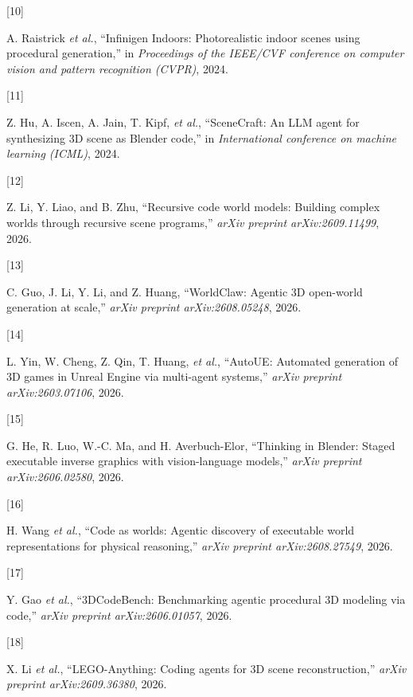 \documentclass[
  11pt,
]{article}
\newlength{\cslhangindent}
\newlength{\csllabelwidth}
\newenvironment{CSLReferences}[2] %
 {\begin{list}{}{%
  \setlength{\itemindent}{0pt}
  \setlength{\leftmargin}{0pt}
  \setlength{\parsep}{0pt}
  \ifodd #1
   \setlength{\leftmargin}{\cslhangindent}
   \setlength{\itemindent}{-1\cslhangindent}
  \fi
  \setlength{\itemsep}{#2\baselineskip}}}
 {\end{list}}
\newcommand{\CSLLeftMargin}[1]{\parbox[t]{\csllabelwidth}{\strut#1\strut}}
\newcommand{\CSLRightInline}[1]{\parbox[t]{\linewidth - \csllabelwidth}{\strut#1\strut}}
\begin{document}
\begin{CSLReferences}{0}{0}
\CSLLeftMargin{{[}10{]} }%
\CSLRightInline{A. Raistrick \emph{et al.}, {``{Infinigen Indoors}:
Photorealistic indoor scenes using procedural generation,''} in
\emph{Proceedings of the IEEE/CVF conference on computer vision and
pattern recognition (CVPR)}, 2024.}

\CSLLeftMargin{{[}11{]} }%
\CSLRightInline{{Z. Hu, A. Iscen, A. Jain, T. Kipf, \emph{et al.}},
{``{SceneCraft}: An {LLM} agent for synthesizing {3D} scene as {Blender}
code,''} in \emph{International conference on machine learning (ICML)},
2024.}

\CSLLeftMargin{{[}12{]} }%
\CSLRightInline{Z. Li, Y. Liao, and B. Zhu, {``Recursive code world
models: Building complex worlds through recursive scene programs,''}
\emph{arXiv preprint arXiv:2609.11499}, 2026.}

\CSLLeftMargin{{[}13{]} }%
\CSLRightInline{C. Guo, J. Li, Y. Li, and Z. Huang, {``{WorldClaw}:
Agentic {3D} open-world generation at scale,''} \emph{arXiv preprint
arXiv:2608.05248}, 2026.}

\CSLLeftMargin{{[}14{]} }%
\CSLRightInline{{L. Yin, W. Cheng, Z. Qin, T. Huang, \emph{et al.}},
{``{AutoUE}: Automated generation of {3D} games in {Unreal Engine} via
multi-agent systems,''} \emph{arXiv preprint arXiv:2603.07106}, 2026.}

\CSLLeftMargin{{[}15{]} }%
\CSLRightInline{G. He, R. Luo, W.-C. Ma, and H. Averbuch-Elor,
{``Thinking in {Blender}: Staged executable inverse graphics with
vision-language models,''} \emph{arXiv preprint arXiv:2606.02580},
2026.}

\CSLLeftMargin{{[}16{]} }%
\CSLRightInline{H. Wang \emph{et al.}, {``Code as worlds: Agentic
discovery of executable world representations for physical reasoning,''}
\emph{arXiv preprint arXiv:2608.27549}, 2026.}

\CSLLeftMargin{{[}17{]} }%
\CSLRightInline{Y. Gao \emph{et al.}, {``{3DCodeBench}: Benchmarking
agentic procedural {3D} modeling via code,''} \emph{arXiv preprint
arXiv:2606.01057}, 2026.}

\CSLLeftMargin{{[}18{]} }%
\CSLRightInline{X. Li \emph{et al.}, {``{LEGO-Anything}: Coding agents
for {3D} scene reconstruction,''} \emph{arXiv preprint
arXiv:2609.36380}, 2026.}


\end{CSLReferences}
\end{document}
